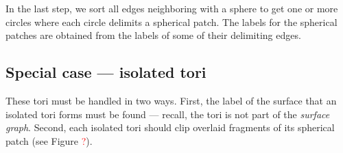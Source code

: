 In the last step, we sort all edges neighboring with a sphere to get one or more circles where each circle delimits a spherical patch.
The labels for the spherical patches are obtained from the labels of some of their delimiting edges.

\subsection{Special case --- isolated tori}

These tori must be handled in two ways.
First, the label of the surface that an isolated tori forms must be found --- recall, the tori is not part of the \textit{surface graph}.
Second, each isolated tori should clip overlaid fragments of its spherical patch (see Figure \textcolor{red}{?}).


